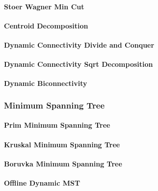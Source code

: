 \documentclass[8pt]{article}
\begin{document}
\paragraph{Stoer Wagner Min Cut}

\paragraph{Centroid Decomposition}

\paragraph{Dynamic Connectivity Divide and Conquer}

\paragraph{Dynamic Connectivity Sqrt Decomposition}

\paragraph{Dynamic Biconnectivity}


\subsubsection{Minimum Spanning Tree}
\paragraph{Prim Minimum Spanning Tree}

\paragraph{Kruskal Minimum Spanning Tree}

\paragraph{Boruvka Minimum Spanning Tree}

\paragraph{Offline Dynamic MST}

\end{document}
